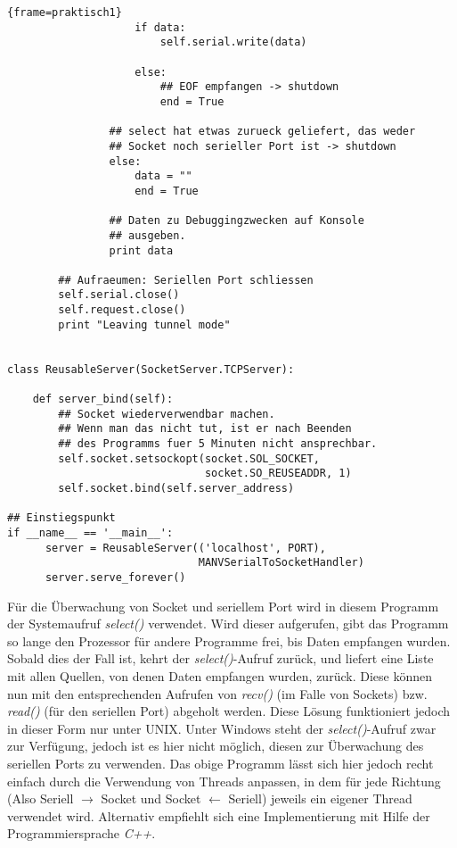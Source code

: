 \begin{lstlisting}{frame=praktisch1}
                    if data:
                        self.serial.write(data)

                    else:
                        ## EOF empfangen -> shutdown
                        end = True

                ## select hat etwas zurueck geliefert, das weder 
                ## Socket noch serieller Port ist -> shutdown
                else:
                    data = ""
                    end = True

                ## Daten zu Debuggingzwecken auf Konsole 
                ## ausgeben.
                print data

        ## Aufraeumen: Seriellen Port schliessen 
        self.serial.close()
        self.request.close()
        print "Leaving tunnel mode"


class ReusableServer(SocketServer.TCPServer):

    def server_bind(self):
        ## Socket wiederverwendbar machen.
        ## Wenn man das nicht tut, ist er nach Beenden 
        ## des Programms fuer 5 Minuten nicht ansprechbar.
        self.socket.setsockopt(socket.SOL_SOCKET,
                               socket.SO_REUSEADDR, 1)
        self.socket.bind(self.server_address)

## Einstiegspunkt 
if __name__ == '__main__':
      server = ReusableServer(('localhost', PORT), 
                              MANVSerialToSocketHandler)
      server.serve_forever()
\end{lstlisting}

Für die Überwachung von Socket und seriellem Port wird in diesem Programm der Systemaufruf
\emph{select()} verwendet. Wird dieser aufgerufen, gibt das Programm so lange den Prozessor
für andere Programme frei, bis Daten empfangen wurden. Sobald dies der Fall ist, kehrt
der \emph{select()}-Aufruf zurück, und liefert eine Liste mit allen Quellen, von denen Daten
empfangen wurden, zurück. Diese können nun mit den entsprechenden Aufrufen von \emph{recv()} 
(im Falle von Sockets) bzw. \emph{read()} (für den seriellen Port) abgeholt werden.
Diese Lösung funktioniert jedoch in dieser Form nur unter UNIX. Unter Windows steht der 
\emph{select()}-Aufruf zwar zur Verfügung, jedoch ist es hier nicht möglich, diesen zur
Überwachung des seriellen Ports zu verwenden. Das obige Programm lässt sich hier jedoch
recht einfach durch die Verwendung von Threads anpassen, in dem für jede Richtung (Also
Seriell $\rightarrow{}$ Socket und Socket $\leftarrow{}$ Seriell) jeweils ein eigener Thread verwendet
wird. Alternativ empfiehlt sich eine Implementierung mit Hilfe der Programmiersprache \emph{C++}.

